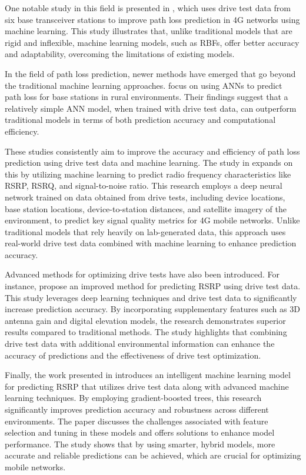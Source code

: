 One notable study in this field is presented in \cite{Ojo2020Radial}, which uses drive test data from six base transceiver stations to improve path loss prediction in 4G networks using machine learning. This study illustrates that, unlike traditional models that are rigid and inflexible, machine learning models, such as \glspl{RBF}, offer better accuracy and adaptability, overcoming the limitations of existing models.

In the field of path loss prediction, newer methods have emerged that go beyond the traditional machine learning approaches. \cite{5466252} focus on using \glspl{ANN} to predict path loss for base stations in rural environments. Their findings suggest that a relatively simple ANN model, when trained with drive test data, can outperform traditional models in terms of both prediction accuracy and computational efficiency.

These studies consistently aim to improve the accuracy and efficiency of path loss prediction using drive test data and machine learning. The study in \cite{thrane2018drive} expands on this by utilizing machine learning to predict radio frequency characteristics like RSRP, RSRQ, and signal-to-noise ratio. This research employs a deep neural network trained on data obtained from drive tests, including device locations, base station locations, device-to-station distances, and satellite imagery of the environment, to predict key signal quality metrics for 4G mobile networks. Unlike traditional models that rely heavily on lab-generated data, this approach uses real-world drive test data combined with machine learning to enhance prediction accuracy.

Advanced methods for optimizing drive tests have also been introduced. For instance, \cite{10212575} propose an improved method for predicting \gls{RSRP} using drive test data. This study leverages deep learning techniques and drive test data to significantly increase prediction accuracy. By incorporating supplementary features such as 3D antenna gain and digital elevation models, the research demonstrates superior results compared to traditional methods. The study highlights that combining drive test data with additional environmental information can enhance the accuracy of predictions and the effectiveness of drive test optimization.

Finally, the work presented in \cite{9700950} introduces an intelligent machine learning model for predicting \gls{RSRP} that utilizes drive test data along with advanced machine learning techniques. By employing gradient-boosted trees, this research significantly improves prediction accuracy and robustness across different environments. The paper discusses the challenges associated with feature selection and tuning in these models and offers solutions to enhance model performance. The study shows that by using smarter, hybrid models, more accurate and reliable predictions can be achieved, which are crucial for optimizing mobile networks.